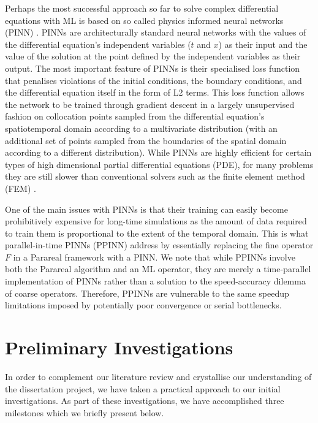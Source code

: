 \documentclass{article}
\begin{document}
Perhaps the most successful approach so far to solve complex differential equations with ML is based on so called physics informed neural networks (PINN) \cite{raissi2017} \cite{tartakovsky2018} \cite{sirignano2018}. PINNs are architecturally standard neural networks with the values of the differential equation's independent variables ($t$ and $x$) as their input and the value of the solution at the point defined by the independent variables as their output. The most important feature of PINNs is their specialised loss function that penalises violations of the initial conditions, the boundary conditions, and the differential equation itself in the form of L2 terms. This loss function allows the network to be trained through gradient descent in a largely unsupervised fashion on collocation points sampled from the differential equation's spatiotemporal domain according to a multivariate distribution (with an additional set of points sampled from the boundaries of the spatial domain according to a different distribution). While PINNs are highly efficient for certain types of high dimensional partial differential equations (PDE), for many problems they are still slower than conventional solvers such as the finite element method (FEM) \cite{lu2019}.

One of the main issues with PINNs is that their training can easily become prohibitively expensive for long-time simulations as the amount of data required to train them is proportional to the extent of the temporal domain. This is what parallel-in-time PINNs (PPINN) \cite{meng2019} address by essentially replacing the fine operator $F$ in a Parareal framework with a PINN. We note that while PPINNs involve both the Parareal algorithm and an ML operator, they are merely a time-parallel implementation of PINNs rather than a solution to the speed-accuracy dilemma of coarse operators. Therefore, PPINNs are vulnerable to the same speedup limitations imposed by potentially poor convergence or serial bottlenecks.

\section{Preliminary Investigations}

In order to complement our literature review and crystallise our understanding of the dissertation project, we have taken a practical approach to our initial investigations. As part of these investigations, we have accomplished three milestones which we briefly present below.
\end{document}
